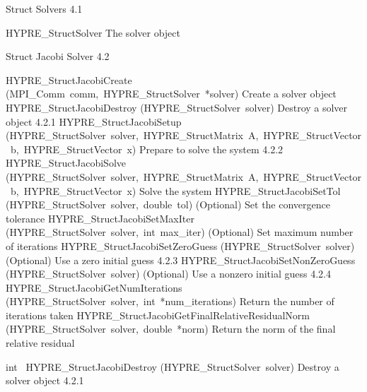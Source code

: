 \documentclass{article}
\begin{document}
\begin{cxxentry}
\begin{cxxdoc}
\end{cxxdoc}
\begin{cxxentry}
{}
        {Struct Solvers}
        {}
        {
}
        {4.1}
\begin{cxxnames}
        {HYPRE\_StructSolver}
        {}
        {
The solver object}
        {}
\label{cxx.4.1.1}
\end{cxxnames}
\end{cxxentry}
\begin{cxxentry}
{}
        {Struct Jacobi Solver}
        {}
        {
}
        {4.2}
\begin{cxxnames}
        {HYPRE\_StructJacobiCreate}
        {(MPI\_Comm\ comm,\ HYPRE\_StructSolver\ *solver)}
        {
Create a solver object}
        {}
\label{cxx.4.2.5}
        {HYPRE\_StructJacobiDestroy}
        {(HYPRE\_StructSolver\ solver)}
        {
Destroy a solver object}
        {4.2.1}
        {HYPRE\_StructJacobiSetup}
        {(HYPRE\_StructSolver\ solver,\ HYPRE\_StructMatrix\ A,\ HYPRE\_StructVector\ b,\ HYPRE\_StructVector\ x)}
        {
Prepare to solve the system}
        {4.2.2}
        {HYPRE\_StructJacobiSolve}
        {(HYPRE\_StructSolver\ solver,\ HYPRE\_StructMatrix\ A,\ HYPRE\_StructVector\ b,\ HYPRE\_StructVector\ x)}
        {
Solve the system}
        {}
\label{cxx.4.2.6}
        {HYPRE\_StructJacobiSetTol}
        {(HYPRE\_StructSolver\ solver,\ double\ tol)}
        {
(Optional) Set the convergence tolerance}
        {}
\label{cxx.4.2.7}
        {HYPRE\_StructJacobiSetMaxIter}
        {(HYPRE\_StructSolver\ solver,\ int\ max\_iter)}
        {
(Optional) Set maximum number of iterations}
        {}
\label{cxx.4.2.8}
        {HYPRE\_StructJacobiSetZeroGuess}
        {(HYPRE\_StructSolver\ solver)}
        {
(Optional) Use a zero initial guess}
        {4.2.3}
        {HYPRE\_StructJacobiSetNonZeroGuess}
        {(HYPRE\_StructSolver\ solver)}
        {
(Optional) Use a nonzero initial guess}
        {4.2.4}
        {HYPRE\_StructJacobiGetNumIterations}
        {(HYPRE\_StructSolver\ solver,\ int\ *num\_iterations)}
        {
Return the number of iterations taken}
        {}
\label{cxx.4.2.9}
        {HYPRE\_StructJacobiGetFinalRelativeResidualNorm}
        {(HYPRE\_StructSolver\ solver,\ double\ *norm)}
        {
Return the norm of the final relative residual}
        {}
\label{cxx.4.2.10}
\end{cxxnames}
\begin{cxxfunction}
{int\ }
        {HYPRE\_StructJacobiDestroy}
        {(HYPRE\_StructSolver\ solver)}
        {
Destroy a solver object}
        {4.2.1}
\begin{cxxdoc}


\end{cxxdoc}
\end{cxxfunction}
\end{cxxentry}
\end{cxxentry}
\end{document}
